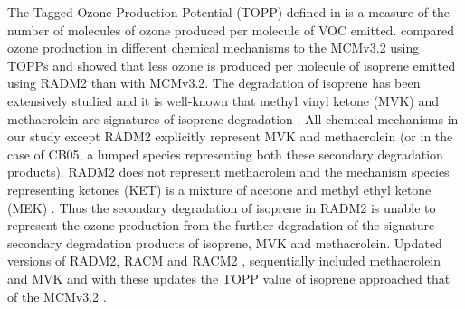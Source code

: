 The Tagged Ozone Production Potential (TOPP) defined in \citet{Butler:2011} is a measure of the number of molecules of ozone produced per molecule of VOC emitted.
\citet{Coates:2015} compared ozone production in different chemical mechanisms to the MCMv3.2 using TOPPs and showed that less ozone is produced per molecule of isoprene emitted using RADM2 than with MCMv3.2.
The degradation of isoprene has been extensively studied and it is well-known that methyl vinyl ketone (MVK) and methacrolein are signatures of isoprene degradation \citep{Atkinson:2000}.
All chemical mechanisms in our study except RADM2 explicitly represent MVK and methacrolein (or in the case of CB05, a lumped species representing both these secondary degradation products).
RADM2 does not represent methacrolein and the mechanism species representing ketones (KET) is a mixture of acetone and methyl ethyl ketone (MEK) \citep{Stockwell:1990}. 
Thus the secondary degradation of isoprene in RADM2 is unable to represent the ozone production from the further degradation of the signature secondary degradation products of isoprene, MVK and methacrolein.
Updated versions of RADM2, RACM \citep{Stockwell:1997} and RACM2 \citep{Goliff:2013}, sequentially included methacrolein and MVK and with these updates the TOPP value of isoprene approached that of the MCMv3.2 \citep{Coates:2015}.

